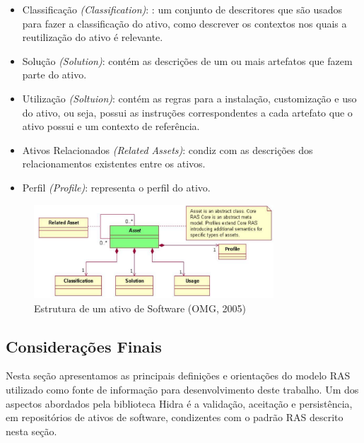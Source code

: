 \begin{itemize}
    \item Classificação \textit{(Classification)}: : um conjunto de descritores que são usados para fazer a classificação do ativo, como descrever os contextos nos quais a reutilização do ativo é relevante.
     \item Solução \textit{(Solution)}: contém as descrições de um ou mais artefatos que fazem parte do ativo.
     \item Utilização \textit{(Soltuion)}: contém as regras para a instalação, customização e uso do ativo, ou seja, possui as instruções correspondentes a cada artefato que o ativo possui e um contexto de referência.
     \item Ativos Relacionados \textit{(Related Assets)}: condiz com as descrições dos relacionamentos existentes entre os ativos.
     \item Perfil \textit{(Profile)}: representa o perfil do ativo.
\end{itemize}
\begin{figure}[H]
\includegraphics[width=0.8\textwidth]{images/modeloAsset}
\centering
\caption{ Estrutura de um ativo de Software (OMG, 2005)}
\label{Rotulo}
\end{figure}

\subsection{Considerações Finais}
    Nesta seção apresentamos as principais definições e orientações do modelo RAS utilizado como fonte de informação para desenvolvimento deste trabalho. Um dos aspectos abordados pela biblioteca Hidra é a validação, aceitação e persistência, em repositórios de ativos de software, condizentes com o padrão RAS descrito nesta seção.




